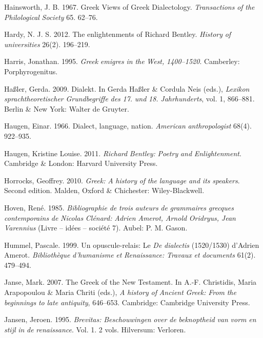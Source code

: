 Hainsworth, J. B. 1967. Greek Views of Greek Dialectology. \textit{Transactions} \textit{of} \textit{the} \textit{Philological} \textit{Society} 65. 62–76.

Hardy, N. J. S. 2012. The enlightenments of Richard Bentley. \textit{History} \textit{of} \textit{universities} 26(2). 196–219.

Harris, Jonathan. 1995. \textit{Greek} \textit{emigres} \textit{in} \textit{the} \textit{West,} \textit{1400–1520}. Camberley: Porphyrogenitus.

Haßler, Gerda. 2009. Dialekt. In Gerda Haßler \& Cordula Neis (eds.), \textit{Lexikon} \textit{sprachtheoretischer} \textit{Grundbegriffe} \textit{des} \textit{17.} \textit{und} \textit{18.} \textit{Jahrhunderts}, vol. 1, 866–881. Berlin \& New York: Walter de Gruyter.

Haugen, Einar. 1966. Dialect, language, nation. \textit{American} \textit{anthropologist} 68(4). 922–935.

Haugen, Kristine Louise. 2011. \textit{Richard} \textit{Bentley:} \textit{Poetry} \textit{and} \textit{Enlightenment}. Cambridge \& London: Harvard University Press.

Horrocks, Geoffrey. 2010. \textit{Greek:} \textit{A} \textit{history} \textit{of} \textit{the} \textit{language} \textit{and} \textit{its} \textit{speakers}. Second edition. Malden, Oxford \& Chichester: Wiley-Blackwell.

Hoven, René. 1985. \textit{Bibliographie} \textit{de} \textit{trois} \textit{auteurs} \textit{de} \textit{grammaires} \textit{grecques} \textit{contemporains} \textit{de} \textit{Nicolas} \textit{Clénard:} \textit{Adrien} \textit{Amerot,} \textit{Arnold} \textit{Oridryus,} \textit{Jean} \textit{Varennius} (Livre – idées – société 7). Aubel: P. M. Gason.

Hummel, Pascale. 1999. Un opuscule-relais: Le \textit{De} \textit{dialectis} (1520/1530) d’Adrien Amerot. \textit{Bibliothèque} \textit{d’humanisme} \textit{et} \textit{Renaissance:} \textit{Travaux} \textit{et} \textit{documents} 61(2). 479–494.

Janse, Mark. 2007. The Greek of the New Testament. In A.-F. Christidis, Maria Arapopoulou \& Maria Chriti (eds.), \textit{A} \textit{history} \textit{of} \textit{Ancient} \textit{Greek:} \textit{From} \textit{the} \textit{beginnings} \textit{to} \textit{late} \textit{antiquity}, 646–653. Cambridge: Cambridge University Press.

Jansen, Jeroen. 1995. \textit{Brevitas:} \textit{Beschouwingen} \textit{over} \textit{de} \textit{beknoptheid} \textit{van} \textit{vorm} \textit{en} \textit{stijl} \textit{in} \textit{de} \textit{renaissance}. Vol. 1. 2 vols. Hilversum: Verloren.

